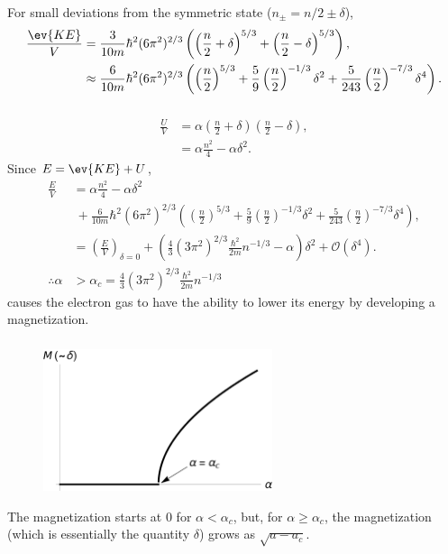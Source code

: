 \documentclass[a4paper,12pt,twoside]{article}
\begin{document}
\begin{multicols*}{2}
\subsubsection{}
For small deviations from the symmetric state ($n_\pm = n/2 \pm \delta$),
\begin{align}
	\frac{\ev{KE}}{V} &= \frac{3}{10m} \hbar^2 (6\pi^2)^{2/3} \left(\left(\frac{n}{2}+\delta\right)^{5/3}+\left( \frac{n}{2}-\delta \right)^{5/3}\right),\\
	&\approx \frac{6}{10m} \hbar^2 (6\pi^2)^{2/3} \left(
	\left(\frac{n}{2}\right)^{5/3}
	+ \frac{5}{9} \left(\frac{n}{2}\right)^{-1/3}\delta^2
	+ \frac{5}{243}\left(\frac{n}{2}\right)^{-7/3}\delta^4
	\right).
\end{align}
\subsubsection{}
\begin{align}
	\frac{U}{V} &= \alpha \left(\frac{n}{2}+\delta\right) \left(\frac{n}{2}-\delta\right),\\
	&= \alpha \frac{n^2}{4} - \alpha \delta^2.
\end{align}
Since $E = \ev{KE}+U$,
\begin{align}
	\frac{E}{V} &= \alpha \frac{n^2}{4} - \alpha \delta^2\nonumber\\
	&\ + \frac{6}{10m} \hbar^2 (6\pi^2)^{2/3} \left(
	\left(\frac{n}{2}\right)^{5/3}
	+ \frac{5}{9} \left(\frac{n}{2}\right)^{-1/3}\delta^2
	+ \frac{5}{243}\left(\frac{n}{2}\right)^{-7/3}\delta^4
	\right),\\
	&= \left(\frac{E}{V}\right)_{\delta=0} + \left( \frac{4}{3}(3\pi^2)^{2/3}\frac{\hbar^2}{2m} n^{-1/3}-\alpha \right)\delta^2 + \mathcal{O}(\delta^4).\\
	\therefore \alpha &> \alpha_c = \frac{4}{3}(3\pi^2)^{2/3}\frac{\hbar^2}{2m} n^{-1/3}
\end{align}
causes the electron gas to have the ability to lower its energy by developing a magnetization.
\subsubsection{}
\begin{figure}[H]
	\centering
	\includegraphics[width=0.6\textwidth]{figures/2eFig.pdf}
	\caption{}
	\label{fig: 2e graph}
\end{figure}
The magnetization starts at $0$ for $\alpha < \alpha_c$, but, for $\alpha \geq \alpha_c$, the magnetization (which is essentially the quantity $\delta$) grows as $\sqrt{a-a_c}$.

\end{multicols*}
\end{document}
